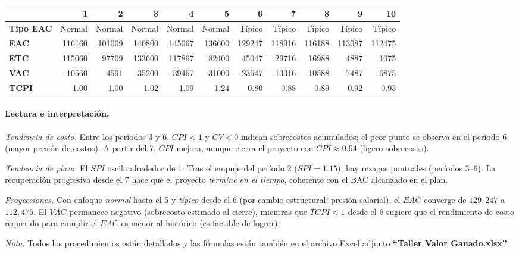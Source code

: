 \begin{table}[H]\centering\small
\begin{tabular}{lrrrrrrrrrr}
\toprule
 & \textbf{1} & \textbf{2} & \textbf{3} & \textbf{4} & \textbf{5} & \textbf{6} & \textbf{7} & \textbf{8} & \textbf{9} & \textbf{10} \\
\midrule
\textbf{Tipo EAC} & Normal & Normal & Normal & Normal & Normal & Típico & Típico & Típico & Típico & Típico \\
\textbf{EAC}      & 116160 & 101009 & 140800 & 145067 & 136600 & 129247 & 118916 & 116188 & 113087 & 112475 \\
\textbf{ETC}      & 115060 & 97709  & 133600 & 117867 & 82400  & 45047  & 29716  & 16988  & 4887   & 1075 \\
\textbf{VAC}      & -10560 & 4591   & -35200 & -39467 & -31000 & -23647 & -13316 & -10588 & -7487  & -6875 \\
\textbf{TCPI}     & 1.00 & 1.00 & 1.02 & 1.09 & 1.24 & 0.80 & 0.88 & 0.89 & 0.92 & 0.93 \\
\bottomrule
\end{tabular}
\end{table}

\paragraph{Lectura e interpretación.}
\textit{Tendencia de costo.} Entre los períodos 3 y 6, \(CPI<1\) y \(CV<0\) indican sobrecostos acumulados; el peor punto se observa en el período 6 (mayor presión de costos). A partir del 7, \(CPI\) mejora, aunque cierra el proyecto con \(CPI\approx0.94\) (ligero sobrecosto).

\medskip
\textit{Tendencia de plazo.} El \(SPI\) oscila alrededor de 1. Tras el empuje del período 2 (\(SPI=1.15\)), hay rezagos puntuales (períodos 3–6). La recuperación progresiva desde el 7 hace que el proyecto \emph{termine en el tiempo}, coherente con el BAC alcanzado en el plan.

\medskip
\textit{Proyecciones.} Con enfoque \emph{normal} hasta el 5 y \emph{típico} desde el 6 (por cambio estructural: presión salarial), el \(EAC\) converge de \(129{,}247\) a \(112{,}475\). El \(VAC\) permanece negativo (sobrecosto estimado al cierre), mientras que \(TCPI<1\) desde el 6 sugiere que el rendimiento de costo requerido para cumplir el \(EAC\) es menor al histórico (es factible de lograr).

\bigskip
\textit{Nota.} Todos los procedimientos están detallados y las fórmulas están también en el archivo Excel adjunto \textbf{``Taller Valor Ganado.xlsx''}.
